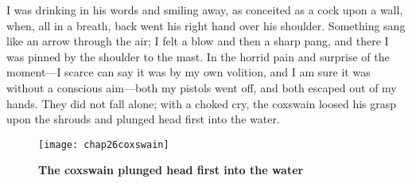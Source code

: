 I was drinking in his words and smiling away, as conceited as a cock upon a wall, when, all in a breath, back went his right hand over his shoulder. Something sang like an arrow through the air; I felt a blow and then a sharp pang, and there I was pinned by the shoulder to the mast. In the horrid pain and surprise of the moment---I scarce can say it was by my own volition, and I am sure it was without a conscious aim---both my pistols went off, and both escaped out of my hands. They did not fall alone; with a choked cry, the coxswain loosed his grasp upon the shrouds and plunged head first into the water.

    \begin{figure}[p]
\centering
\texttt{[image: chap26coxswain]}
\caption{\textbf{The coxswain plunged head first into the water}}
\end{figure}   